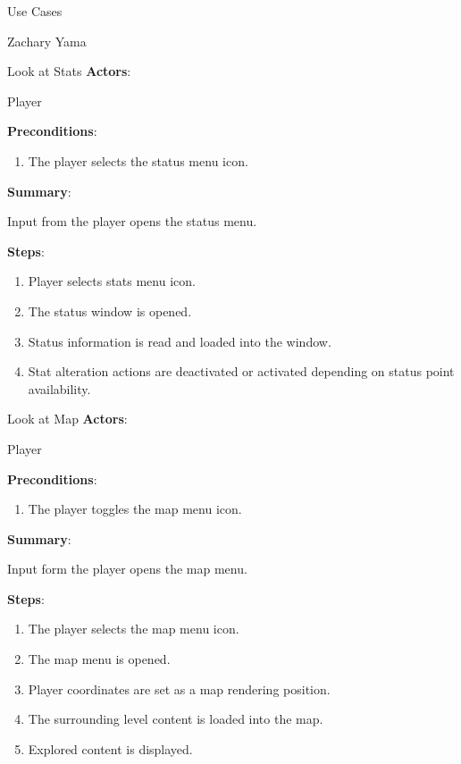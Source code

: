 \documentclass[12pt]{report}
\begin{document}
\begin{section}{Use Cases}
\begin{subsection}{Zachary Yama}
\begin{subsubsection}{Look at Stats}
\textbf{Actors}:

Player

\textbf{Preconditions}:

\begin{enumerate}
\item The player selects the status menu icon.
\end{enumerate}

\textbf{Summary}:

Input from the player opens the status menu.

\textbf{Steps}:

\begin{enumerate}
\item Player selects stats menu icon.
\item The status window is opened.
\item Status information is read and loaded into the window.
\item Stat alteration actions are deactivated or activated depending on
status point availability.
\end{enumerate}
\end{subsubsection}

\begin{subsubsection}{Look at Map}
\textbf{Actors}:

Player

\textbf{Preconditions}:

\begin{enumerate}
\item The player toggles the map menu icon.
\end{enumerate}

\textbf{Summary}:

Input form the player opens the map menu.

\textbf{Steps}:

\begin{enumerate}
\item The player selects the map menu icon.
\item The map menu is opened.
\item Player coordinates are set as a map rendering position.
\item The surrounding level content is loaded into the map.
\item Explored content is displayed.
\end{enumerate}
\end{subsubsection}


\end{subsection}
\end{section}
\end{document}
